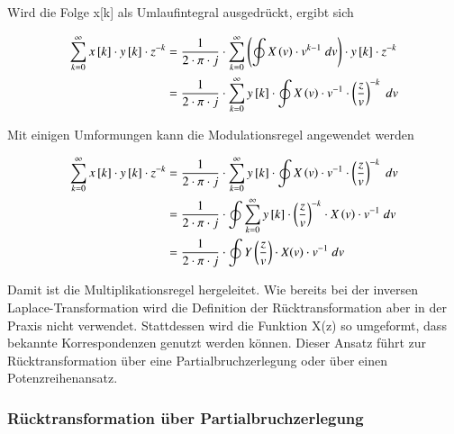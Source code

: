 \noindent Wird die Folge x[k] als Umlaufintegral ausgedr\"{u}ckt, ergibt sich

\begin{equation}\label{eq:fiveeightyfour}
\begin{split}
\sum _{k=0}^{\infty }x\left[k\right]\cdot y\left[k\right]\cdot z^{-k} & =\frac{1}{2\cdot \pi \cdot j} \cdot \sum _{k=0}^{\infty }\left(\oint X\left(v\right)\cdot v^{k-1} {\rm \; }dv \right)\cdot y\left[k\right]\cdot z^{-k} \\
&= \frac{1}{2\cdot \pi \cdot j} \cdot \sum _{k=0}^{\infty }y\left[k\right]\cdot \oint X\left(v\right)\cdot v^{-1} \cdot \left(\frac{z}{v} \right)^{-k} {\rm \; }dv
\end{split}
\end{equation}

\noindent Mit einigen Umformungen kann die Modulationsregel angewendet werden

\begin{equation}\label{eq:fiveeightyfive}
\begin{split}
\sum _{k=0}^{\infty }x\left[k\right]\cdot y\left[k\right]\cdot z^{-k} & = \frac{1}{2\cdot \pi \cdot j} \cdot \sum _{k=0}^{\infty }y\left[k\right]\cdot \oint X\left(v\right)\cdot v^{-1} \cdot \left(\frac{z}{v} \right)^{-k} {\rm \; }dv\\
&=\frac{1}{2\cdot \pi \cdot j} \cdot \oint \sum _{k=0}^{\infty }y\left[k\right]\cdot \left(\frac{z}{v} \right)^{-k}\cdot X\left(v\right)\cdot v^{-1}   {\rm \; }dv\\
&=\frac{1}{2\cdot \pi \cdot j} \cdot \oint Y\left(\frac{z}{v} \right)\cdot X(v) \cdot  v^{-1}  {\rm \; }dv
\end{split}
\end{equation}

\noindent Damit ist die Multiplikationsregel hergeleitet. Wie bereits bei der inversen Laplace-Transformation wird die Definition der R\"{u}cktransformation aber in der Praxis nicht verwendet. Stattdessen wird die Funktion X(z) so umgeformt, dass bekannte Korrespondenzen genutzt werden k\"{o}nnen. Dieser Ansatz f\"{u}hrt zur R\"{u}cktransformation \"{u}ber eine Partialbruchzerlegung oder \"{u}ber einen Potenzreihenansatz.

\clearpage

\subsubsection{R\"{u}cktransformation \"{u}ber Partialbruchzerlegung}

